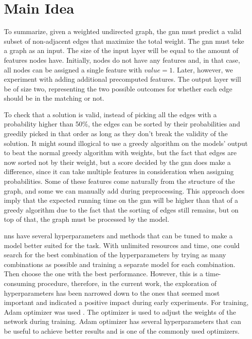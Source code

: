 \section{Main Idea}

To summarize, given a weighted undirected graph, the \gls{gnn} must predict a valid subset of non-adjacent edges that maximize the total weight. The \gls{gnn} must teke a graph as an input. The size of the input layer will be equal to the amount of features nodes have. Initially, nodes do not have any features and, in that case, all nodes can be assigned a single feature with $value = 1$. Later, however, we experiment with adding additional precomputed features. The output layer will be of size two, representing the two possible outcomes for whether each edge should be in the matching or not. 

To check that a solution is valid, instead of picking all the edges with a probability higher than 50\%, the edges can be sorted by their probabilities and greedily picked in that order as long as they don't break the validity of the solution. It might sound illogical to use a greedy algorithm on the models' output to beat the normal greedy algorithm with weights, but the fact that edges are now sorted not by their weight, but a score decided by the \gls{gnn} does make a difference, since it can take multiple features in consideration when assigning probabilities. Some of these features come naturally from the structure of the graph, and some we can manually add during preprocessing. This approach does imply that the expected running time on the \gls{gnn} will be higher than that of a greedy algorithm due to the fact that the sorting of edges still remains, but on top of that, the graph must be processed by the model.

\gls{nn}s have several hyperparameters and methods that can be tuned to make a model better suited for the task. With unlimited resources and time, one could search for the best combination of the hyperparameters by trying as many combinations as possible and training a separate model for each combination. Then choose the one with the best performance. However, this is a time-consuming procedure, therefore, in the current work, the exploration of hyperparameters has been narrowed down to the ones that seemed most important and indicated a positive impact during early experiments. For training, Adam optimizer was used \cite{kingma2017adam}. The optimizer is used to adjust the weights of the network during training. Adam optimizer has several hyperparameters that can be useful to achieve better results and is one of the commonly used optimizers.

